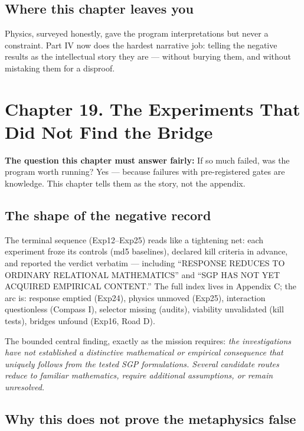 \documentclass[
  11pt,
]{book}
\begin{document}
\section{Where this chapter leaves
you}\label{where-this-chapter-leaves-you-16}

Physics, surveyed honestly, gave the program interpretations but never a
constraint. Part IV now does the hardest narrative job: telling the
negative results as the intellectual story they are --- without burying
them, and without mistaking them for a disproof.

\newpage

\chapter{Chapter 19. The Experiments That Did Not Find the
Bridge}\label{chapter-19.-the-experiments-that-did-not-find-the-bridge}

\textbf{The question this chapter must answer fairly:} If so much
failed, was the program worth running? Yes --- because failures with
pre-registered gates are knowledge. This chapter tells them as the
story, not the appendix.

\section{The shape of the negative
record}\label{the-shape-of-the-negative-record}

The terminal sequence (Exp12--Exp25) reads like a tightening net: each
experiment froze its controls (md5 baselines), declared kill criteria in
advance, and reported the verdict verbatim --- including ``RESPONSE
REDUCES TO ORDINARY RELATIONAL MATHEMATICS'' and ``SGP HAS NOT YET
ACQUIRED EMPIRICAL CONTENT.'' The full index lives in Appendix C; the
arc is: response emptied (Exp24), physics unmoved (Exp25), interaction
questionless (Compass I), selector missing (audits), viability
unvalidated (kill tests), bridges unfound (Exp16, Road D).

The bounded central finding, exactly as the mission requires: \emph{the
investigations have not established a distinctive mathematical or
empirical consequence that uniquely follows from the tested SGP
formulations. Several candidate routes reduce to familiar mathematics,
require additional assumptions, or remain unresolved.}

\section{Why this does not prove the metaphysics
false}\label{why-this-does-not-prove-the-metaphysics-false}
\end{document}
